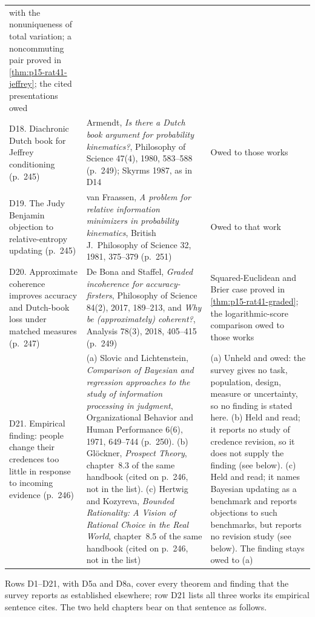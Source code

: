 \begin{longtable}{@{}p{.28\linewidth}p{.32\linewidth}p{.30\linewidth}@{}}
with the nonuniqueness of total variation; a noncommuting pair proved in
\cref{thm:p15-rat41-jeffrey}; the cited presentations owed \\
D18. Diachronic Dutch book for Jeffrey conditioning (p.~245) &
Armendt, \emph{Is there a Dutch book argument for probability
kinematics?}, Philosophy of Science 47(4), 1980, 583--588 (p.~249);
Skyrms 1987, as in D14 &
Owed to those works \\
D19. The Judy Benjamin objection to relative-entropy updating (p.~245) &
van Fraassen, \emph{A problem for relative information minimizers in
probability kinematics}, British J.\ Philosophy of Science 32, 1981,
375--379 (p.~251) &
Owed to that work \\
D20. Approximate coherence improves accuracy and Dutch-book loss under
matched measures (p.~247) &
De Bona and Staffel, \emph{Graded incoherence for accuracy-firsters},
Philosophy of Science 84(2), 2017, 189--213, and \emph{Why be
(approximately) coherent?}, Analysis 78(3), 2018, 405--415 (p.~249) &
Squared-Euclidean and Brier case proved in \cref{thm:p15-rat41-graded};
the logarithmic-score comparison owed to those works \\
D21. Empirical finding: people change their credences too little in
response to incoming evidence (p.~246) &
(a) Slovic and Lichtenstein, \emph{Comparison of Bayesian and regression
approaches to the study of information processing in judgment},
Organizational Behavior and Human Performance 6(6), 1971, 649--744
(p.~250). (b) Gl\"ockner, \emph{Prospect Theory}, chapter~8.3 of the same
handbook (cited on p.~246, not in the list). (c) Hertwig and Kozyreva,
\emph{Bounded Rationality: A Vision of Rational Choice in the Real World},
chapter~8.5 of the same handbook (cited on p.~246, not in the list) &
(a) Unheld and owed: the survey gives no task, population, design,
measure or uncertainty, so no finding is stated here. (b) Held and read;
it reports no study of credence revision, so it does not supply the
finding (see below). (c) Held and read; it names Bayesian updating as a
benchmark and reports objections to such benchmarks, but reports no
revision study (see below). The finding stays owed to (a) \\
\bottomrule
\end{longtable}

Rows D1--D21, with D5a and D8a, cover every theorem and finding that the
survey reports as established elsewhere; row D21 lists all three works its
empirical sentence cites. The two held chapters bear on that sentence as
follows.

